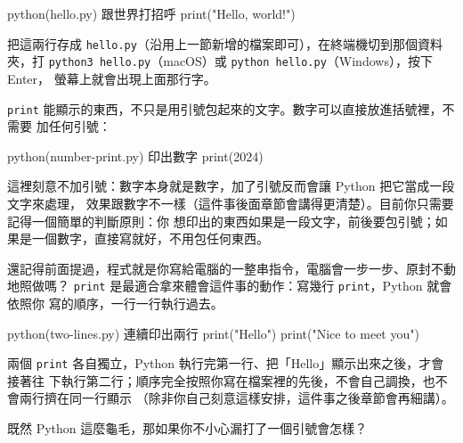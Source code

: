 \begin{example}{python}{(hello.py) 跟世界打招呼}
print("Hello, world!")
\end{example}


把這兩行存成 \texttt{hello.py}（沿用上一節新增的檔案即可），在終端機切到那個資料夾，打
\texttt{python3 hello.py}（macOS）或 \texttt{python hello.py}（Windows），按下 Enter，
螢幕上就會出現上面那行字。

\texttt{print} 能顯示的東西，不只是用引號包起來的文字。數字可以直接放進括號裡，不需要
加任何引號：

\begin{example}{python}{(number-print.py) 印出數字}
print(2024)
\end{example}


這裡刻意不加引號：數字本身就是數字，加了引號反而會讓 Python 把它當成一段文字來處理，
效果跟數字不一樣（這件事後面章節會講得更清楚）。目前你只需要記得一個簡單的判斷原則：你
想印出的東西如果是一段文字，前後要包引號；如果是一個數字，直接寫就好，不用包任何東西。

還記得前面提過，程式就是你寫給電腦的一整串指令，電腦會一步一步、原封不動地照做嗎？
\texttt{print} 是最適合拿來體會這件事的動作：寫幾行 \texttt{print}，Python 就會依照你
寫的順序，一行一行執行過去。

\begin{example}{python}{(two-lines.py) 連續印出兩行}
print("Hello")
print("Nice to meet you")
\end{example}


兩個 \texttt{print} 各自獨立，Python 執行完第一行、把「Hello」顯示出來之後，才會接著往
下執行第二行；順序完全按照你寫在檔案裡的先後，不會自己調換，也不會兩行擠在同一行顯示
（除非你自己刻意這樣安排，這件事之後章節會再細講）。


既然 Python 這麼龜毛，那如果你不小心漏打了一個引號會怎樣？

